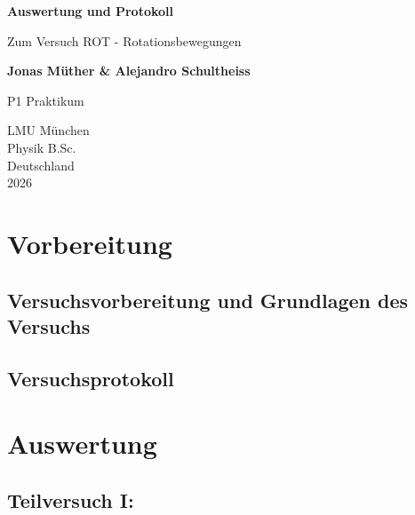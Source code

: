 \documentclass{report}
\begin{document}

\begin{titlepage}
    \begin{center}
        \vspace*{1cm}
            
        \Huge
        \textbf{Auswertung und Protokoll}
            
        \vspace{0.5cm}
        \LARGE
        Zum Versuch ROT - Rotationsbewegungen
        
        \vspace{1.8cm}

        \textbf{Jonas Müther \& Alejandro Schultheiss}
        \vfill
            
        P1 Praktikum\\
       
            
        \vspace{0.8cm}
  

        \vspace{1.8cm}
        \Large
        LMU München \\
        Physik B.Sc.\\
        Deutschland\\
        2026
            
    \end{center}
\end{titlepage}
\tableofcontents

\newpage
\chapter{Vorbereitung}

\section{Versuchsvorbereitung und Grundlagen des Versuchs}


\section{Versuchsprotokoll}


\newpage
\chapter{Auswertung}
\section{Teilversuch I:}
\end{document}
